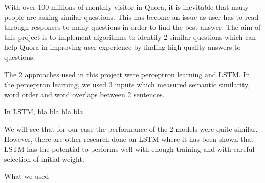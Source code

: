 With over 100 millions of monthly visitor in Quora, it is inevitable that many people are asking similar questions. This has become an issue as user has to read through responses to many questions in order to find the best answer. The aim of this project is to implement algorithms to identify 2 similar questions which can help Quora in improving user experience by finding high quality answers to questions.

The 2 approaches used in this project were perceptron learning and LSTM. In the perceptron learning, we used 3 inputs which measured semantic similarity, word order and word overlaps between 2 sentences.

In LSTM, bla bla bla bla

We will see that for our case the performance of the 2 models were quite similar. However, there are other research done on LSTM where it has been shown that LSTM has the potential to performs well with enough training and with careful selection of initial weight.

What we used